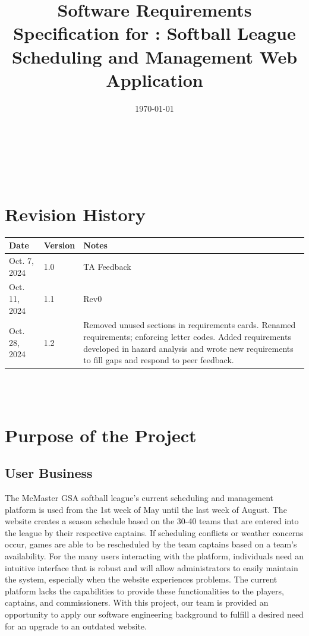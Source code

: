 \documentclass[12pt]{article}
\begin{document}
\title{Software Requirements Specification for \progname: Softball League Scheduling and Management Web Application} 
\author{\authname}
\date{\today}
	
\maketitle

~\newpage


\tableofcontents

~\newpage

\section*{Revision History}

\begin{tabularx}{\textwidth}{p{3cm}p{2cm}X}
\toprule {\textbf{Date}} & {\textbf{Version}} & {\textbf{Notes}}\\
\midrule
Oct. 7, 2024 & 1.0 & TA Feedback\\
Oct. 11, 2024 & 1.1 & Rev0\\
Oct. 28, 2024 & 1.2 & Removed unused sections in requirements cards. Renamed
requirements; enforcing letter codes. Added requirements developed in hazard
analysis and wrote new requirements to fill gaps and respond to peer feedback.
\\
\bottomrule
\end{tabularx}

~\\

~\newpage
\section{Purpose of the Project}

\subsection{User Business}

The McMaster GSA softball league's current scheduling and management platform
is used from the 1st week of May until the last week of August. The website
creates a season schedule based on the 30-40 teams that are entered into the
league by their respective captains. If scheduling conflicts or weather concerns
occur, games are able to be rescheduled by the team captains based on a team's
availability. For the many users interacting with the platform, individuals need
an intuitive interface that is robust and will allow administrators to easily
maintain the system, especially when the website experiences problems. The current
platform lacks the capabilities to provide these functionalities to the players,
captains, and commissioners. With this project, our team is provided an
opportunity to apply our software engineering background to fulfill a
desired need for an upgrade to an outdated website.
\end{document}
